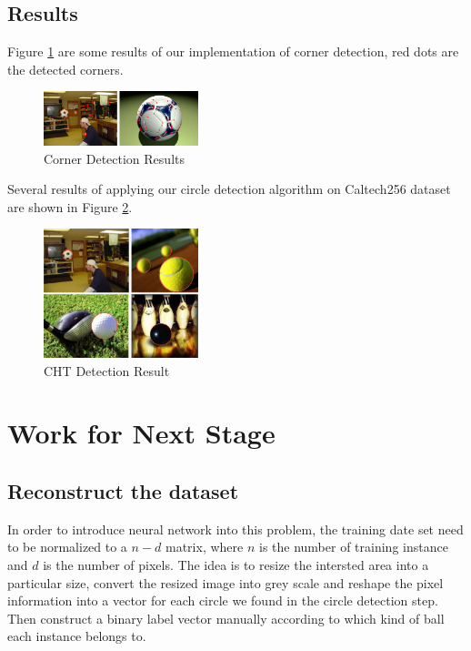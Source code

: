 \documentclass{article}
\begin{document}
\subsection{Results}
Figure \ref{fig:crd} are some results of our implementation of corner detection, red dots are the detected corners.\\
\begin{figure}[htp]
\centering
	\includegraphics[width=0.4\textwidth]{CornerDetection.jpg}
\caption{Corner Detection Results}
\label{fig:crd}
\end{figure}
Several results of applying our circle detection algorithm on Caltech256 dataset are shown in Figure \ref{fig:cird}.
\begin{figure}[htp]
\centering
\includegraphics[width=0.4\textwidth]{circleDetection.jpg}
\caption{CHT Detection Result}
\label{fig:cird}
\end{figure}
\section{Work for Next Stage} 

\subsection{Reconstruct the dataset}
In order to introduce neural network into this problem, the training date set need to be normalized to a $n-d$ matrix, where $n$ is the number of training instance and $d$ is the number of pixels. The idea is to resize the intersted area into a particular size, convert the resized image into grey scale and reshape the pixel information into a vector for each circle we found in the circle detection step. Then construct a binary label vector manually according to which kind of ball each instance belongs to.
\end{document}
